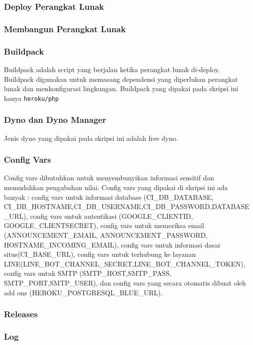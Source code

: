 \subsubsection{Deploy Perangkat Lunak}

\subsubsection{Membangun Perangkat Lunak}

\subsubsection{Buildpack}
Buildpack adalah script yang berjalan ketika perangkat lunak di-deploy. Buildpack digunakan untuk memasang dependensi yang diperlukan perangkat lunak dan menkonfigurasi lingkungan. Buildpack yang dipakai pada skripsi ini hanya \texttt{heroku/php}

\subsubsection{Dyno dan Dyno Manager}
Jenis dyno yang dipakai pada skripsi ini adalah free dyno.

\subsubsection{Config Vars}
Config vars dibutuhkan untuk menyembunyikan informasi sensitif dan memudahkan pengubahan nilai. Config vars yang dipakai di skripsi ini ada banyak : config vars untuk informasi database (CI\_DB\_DATABASE, CI\_DB\_HOSTNAME,CI\_DB\_USERNAME,CI\_DB\_PASSWORD,DATABASE\_URL), config vars untuk autentikasi (GOOGLE\_CLIENTID, GOOGLE\_CLIENTSECRET), config vars untuk memeriksa email (ANNOUNCEMENT\_EMAIL, ANNOUNCEMENT\_PASSWORD, HOSTNAME\_INCOMING\_EMAIL), config vars untuk informasi dasar situs(CI\_BASE\_URL), config vars untuk terhubung ke layanan LINE(LINE\_BOT\_CHANNEL\_SECRET,LINE\_BOT\_CHANNEL\_TOKEN), config vars untuk SMTP (SMTP\_HOST,SMTP\_PASS, SMTP\_PORT,SMTP\_USER), dan config vars yang secara otomatis dibuat oleh add ons (HEROKU\_POSTGRESQL\_BLUE\_URL).

\subsubsection{Releases}

\subsubsection{Log}

